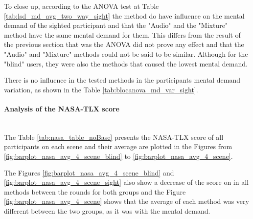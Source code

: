 
%

To close up, according to the ANOVA test at Table \ref{tab:lsd_md_avg_two_way_sight} the method do have influence on the mental demand of the sighted participant and that the "Audio" and the "Mixture" method have the same mental demand for them. This differs from the result of the previous section that was the ANOVA did not prove any effect and that the "Audio" and "Mixture" methods could not be said to be similar. Although for the "blind" users, they were also the methods that caused the lowest mental demand.

There is no influence in the tested methods in the participants mental demand variation, as shown in the Table \ref{tab:blocanova_md_var_sight}.

\FloatBarrier



\paragraph{Analysis of the NASA-TLX score}\mbox{}\\

The Table \ref{tab:nasa_table_noBase} presents the NASA-TLX score of all participants on each scene and their average are plotted in the Figures from \ref{fig:barplot_nasa_avg_4_scene_blind} to \ref{fig:barplot_nasa_avg_4_scene}. 



The Figures \ref{fig:barplot_nasa_avg_4_scene_blind} and \ref{fig:barplot_nasa_avg_4_scene_sight} also show a decrease of the score on in all methods between the rounds for both groups and the Figure \ref{fig:barplot_nasa_avg_4_scene} shows that the average of each method was very different between the two groups, as it was with the mental demand.

